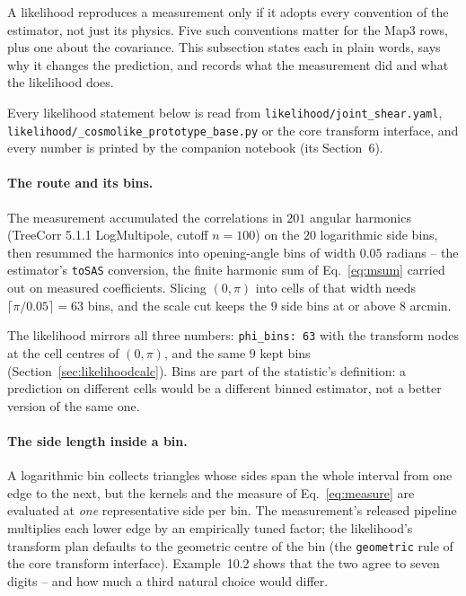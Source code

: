 \documentclass[11pt]{article}
\newcommand{\us}{\_\allowbreak}
\numberwithin{equation}{section}
\begin{document}
A likelihood reproduces a measurement only if it adopts every
convention of the estimator, not just its physics.  Five such
conventions matter for the Map3 rows, plus one about the covariance.
This subsection states each in plain words, says why it changes the
prediction, and records what the measurement did and what the
likelihood does.

Every likelihood statement below is read from
\texttt{likelihood/joint\us shear.yaml},
\texttt{likelihood/\us cosmolike\us prototype\us base.py} or the
core transform interface, and every number is printed by the
companion notebook (its Section~6).

\paragraph{The route and its bins.}
The measurement accumulated the correlations in $201$ angular
harmonics (TreeCorr 5.1.1 LogMultipole, cutoff $n = 100$) on the
$20$ logarithmic side bins, then resummed the harmonics into
opening-angle bins of width $0.05$ radians -- the estimator's
\texttt{toSAS} conversion, the finite harmonic sum of
Eq.~\eqref{eq:msum} carried out on measured coefficients.  Slicing
$(0, \pi)$ into cells of that width needs
$\lceil \pi/0.05 \rceil = 63$ bins, and the scale cut keeps the
$9$ side bins at or above $8$ arcmin.

The likelihood mirrors all three numbers: \texttt{phi\us bins: 63}
with the transform nodes at the cell centres of $(0, \pi)$, and the
same $9$ kept bins (Section~\ref{sec:likelihoodcalc}).  Bins are
part of the statistic's definition: a prediction on different cells
would be a different binned estimator, not a better version of the
same one.

\paragraph{The side length inside a bin.}
A logarithmic bin collects triangles whose sides span the whole
interval from one edge to the next, but the kernels and the measure
of Eq.~\eqref{eq:measure} are evaluated at \emph{one}
representative side per bin.  The measurement's released pipeline
multiplies each lower edge by an empirically tuned factor; the
likelihood's transform plan defaults to the geometric centre of the
bin (the \texttt{geometric} rule of the core transform interface).
Example~10.2 shows that the two agree to seven digits -- and how
much a third natural choice would differ.
\end{document}
